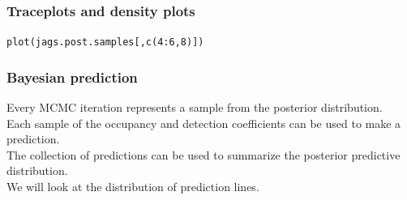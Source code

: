 \documentclass[color=usenames,dvipsnames]{beamer}\usepackage[]{graphicx}\usepackage[]{xcolor}
\makeatletter
\newcommand{\hlnum}[1]{\textcolor[rgb]{0.69,0.494,0}{#1}}%
\newcommand{\hlopt}[1]{\textcolor[rgb]{0,0,0}{#1}}%
\newcommand{\hldef}[1]{\textcolor[rgb]{0,0,0}{#1}}%
\newcommand{\hlkwd}[1]{\textcolor[rgb]{0.004,0.004,0.506}{#1}}%
\newenvironment{kframe}{%
 \def\at@end@of@kframe{}%
 \ifinner\ifhmode%
  \def\at@end@of@kframe{\end{minipage}}%
  \begin{minipage}{\columnwidth}%
 \fi\fi%
 \def\FrameCommand##1{\hskip\@totalleftmargin \hskip-\fboxsep
 \colorbox{shadecolor}{##1}\hskip-\fboxsep
     \hskip-\linewidth \hskip-\@totalleftmargin \hskip\columnwidth}%
 \MakeFramed {\advance\hsize-\width
   \@totalleftmargin\z@ \linewidth\hsize
   \@setminipage}}%
 {\par\unskip\endMakeFramed%
 \at@end@of@kframe}
\newenvironment{knitrout}{}{} %
\makeatother
\begin{document}
\begin{frame}[fragile]
  \frametitle{Traceplots and density plots}
\begin{knitrout}\footnotesize
{}\color{fgcolor}\begin{kframe}
\begin{alltt}
\hlkwd{plot}\hldef{(jags.post.samples[,}\hlkwd{c}\hldef{(}\hlnum{4}\hlopt{:}\hlnum{6}\hldef{,}\hlnum{8}\hldef{)])}
\end{alltt}


{\ttfamily\noindent\bfseries\color{errorcolor}{\#\# Error in (function (cond) : error in evaluating the argument 'x' in selecting a method for function 'plot': subscript out of bounds}}\end{kframe}
\end{knitrout}
\end{frame}


\begin{frame}
  \frametitle{Bayesian prediction}
  Every MCMC iteration represents a sample from the posterior
  distribution. \\
  \pause
  \vfill
  Each sample of the occupancy and detection coefficients can be used
  to make a prediction. \\
  \pause
  \vfill
  The collection of predictions can be used to summarize the posterior 
  predictive distribution. \\
  \pause
  \vfill
  We will look at the distribution of prediction lines. \\  
\end{frame}
\end{document}
